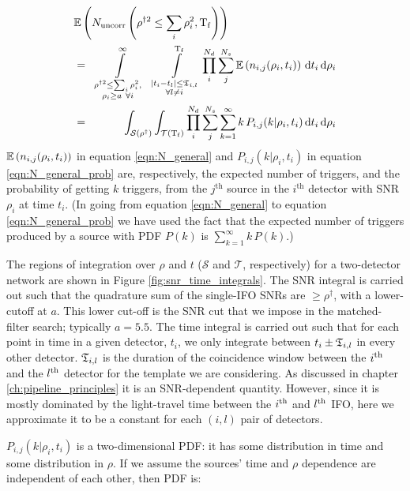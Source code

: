 \begin{eqnarray}
\lefteqn{ \Exptd\left(N_{\mathrm{uncorr}}\left(\rho^{\dagger2} \leq \sum_i\rho_i^2, \Tf \right)\right) } \nonumber \\
\label{eqn:N_general}
& = & \int\limits_{\substack{\rho^{\dagger2} \leq \sum_i\rho_i^2, \\ \rho_i \geq a ~ \forall i}}^{\infty}~~ \int\limits_{\substack{ |t_i - t_l| \leq \coincT_{i,l} \\ \forall l \neq i}}^{\Tf} \prod_i^{N_d} \sum_j^{N_s} \Exptd\left(n_{i,j}(\rho_i,t_i) \right) \d t_i \d\rho_i \\ 
\label{eqn:N_general_prob}
& = & \int_{\mathcal{S}(\rho^\dagger)} \int_{\mathcal{T}(\Tf)} \prod_i^{N_d} \sum_j^{N_s}  \sum_{k=1}^{\infty} k\,P_{i,j}(k|\rho_i,t_i) \d t_i \d\rho_i 
\end{eqnarray}
$\mathbb{E}\left( n_{i,j}(\rho_i, t_i ) \right)$ in equation \ref{eqn:N_general} and $P_{i,j}(k|\rho_i,t_i)$ in equation \ref{eqn:N_general_prob} are, respectively, the expected number of triggers, and the probability of getting $k$ triggers, from the $j^{\mathrm{th}}$ source in the $i^{\mathrm{th}}$ detector with \ac{SNR} $\rho_i$ at time $t_i$. (In going from equation \ref{eqn:N_general} to equation \ref{eqn:N_general_prob} we have used the fact that the expected number of triggers produced by a source with \ac{PDF} $P(k)$ is $\sum_{k=1}^{\infty} k\,P(k)$.)

The regions of integration over $\rho$ and $t$ ($\mathcal{S}$ and $\mathcal{T}$, respectively) for a two-detector network are shown in Figure \ref{fig:snr_time_integrals}. The \ac{SNR} integral is carried out such that the quadrature sum of the single-\ac{IFO} \acp{SNR} are $\geq \rho^\dagger$, with a lower-cutoff at $a$. This lower cut-off is the \ac{SNR} cut that we impose in the matched-filter search; typically $a=5.5$. The time integral is carried out such that for each point in time in a given detector, $t_i$, we only integrate between $t_i \pm \mathfrak{T}_{i,l}$ in every other detector. $\mathfrak{T}_{i,l}$ is the duration of the coincidence window between the $i^{\mathrm{th}}$ and the $l^{\mathrm{th}}$ detector for the template we are considering. As discussed in chapter \ref{ch:pipeline_principles} it is an \ac{SNR}-dependent quantity. However, since it is mostly dominated by the light-travel time between the $i^{\mathrm{th}}$ and $l^{\mathrm{th}}$ \ac{IFO}, here we approximate it to be a constant for each $(i,l)$ pair of detectors. 

$P_{i,j}(k|\rho_i,t_i)$ is a two-dimensional \ac{PDF}: it has some distribution in time and some distribution in $\rho$. If we assume the sources' time and $\rho$ dependence are independent of each other, then \ac{PDF} is:

